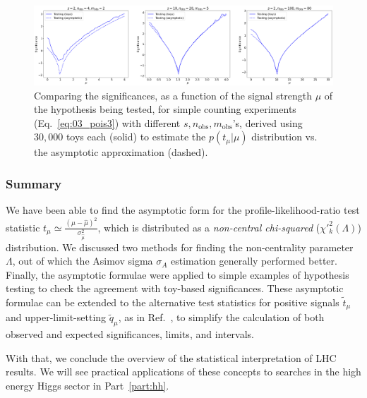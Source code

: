 \begin{figure}[htb]
  \centering
  \includegraphics[width=\textwidth]{figures/03-Stats/06-asymptotic-plr/5.png}
  \caption[Comparing the significances, as a function of the signal strength $\mu$ of the hypothesis being tested, for simple counting experiments (Eq.~\ref{eq:03_pois3}) with different $s, n_{\mathrm{obs}}, m_{\mathrm{obs}}$'s.]{Comparing the significances, as a function of the signal strength $\mu$ of the hypothesis being tested, for simple counting experiments (Eq.~\ref{eq:03_pois3}) with different $s, n_{\mathrm{obs}}, m_{\mathrm{obs}}$'s, derived using $30,000$ toys each (solid) to estimate the $p(t_\mu|\mu)$ distribution vs. the asymptotic approximation (dashed).}
  \label{fig:03_asym_significances}
\end{figure}


\subsubsection{Summary}

We have been able to find the asymptotic form for the profile-likelihood-ratio test statistic $t_\mu \simeq \frac{(\mu-\hat\mu)^2}{\sigma_{\hat\mu}^2}$, which is distributed as a \textit{non-central chi-squared} ($\chi'^2_k(\Lambda)$) distribution.
We discussed two methods for finding the non-centrality parameter $\Lambda$, out of which the Asimov sigma $\sigma_A$ estimation generally performed better.
Finally, the asymptotic formulae were applied to simple examples of hypothesis testing to check the agreement with toy-based significances.
These asymptotic formulae can be extended to the alternative test statistics for positive signals $\tilde{t}_\mu$ and upper-limit-setting $\tilde{q}_\mu$, as in Ref.~\cite{Cowan:2010js}, to simplify the calculation of both observed and expected significances, limits, and intervals.

With that, we conclude the overview of the statistical interpretation of LHC results.
We will see practical applications of these concepts to searches in the high energy Higgs sector in Part~\ref{part:hh}.



